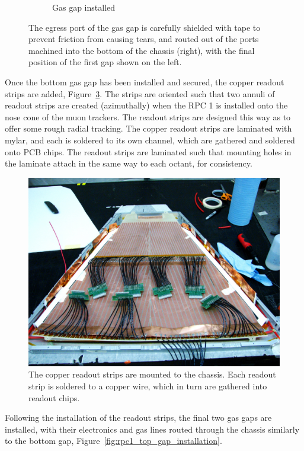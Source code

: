 \begin{figure}
\begin{subfigure}[b]{0.5\textwidth}
    \caption{Gas gap installed}
    \label{fig:rpc1_bottom_gap_installed}
  \end{subfigure}
  \caption{
    The egress port of the gas gap is carefully shielded with tape to prevent
    friction from causing tears, and routed out of the ports machined into the
    bottom of the chassis (right), with the final position of the first gap
    shown on the left.
  }
  \label{fig:rpc1_bottom_gap_installation}
\end{figure}

Once the bottom gas gap has been installed and secured, the copper readout
strips are added, Figure~\ref{fig:rpc1_construction_5}. The strips are oriented
such that two annuli of readout strips are created (azimuthally) when the RPC 1
is installed onto the nose cone of the muon trackers. The readout strips are
designed this way as to offer some rough radial tracking. The copper readout
strips are laminated with mylar, and each is soldered to its own channel, which
are gathered and soldered onto PCB chips. The readout strips are laminated such
that mounting holes in the laminate attach in the same way to each octant, for
consistency.

\begin{figure}
  \centering
  \includegraphics[width=0.7\linewidth]{./figures/rpc1_construction_5}
  \caption{
    The copper readout strips are mounted to the chassis. Each readout strip is
    soldered to a copper wire, which in turn are gathered into readout chips.
  }
  \label{fig:rpc1_construction_5}
\end{figure}

Following the installation of the readout strips, the final two gas gaps are
installed, with their electronics and gas lines routed through the chassis
similarly to the bottom gap, Figure~\ref{fig:rpc1_top_gap_installation}. 

